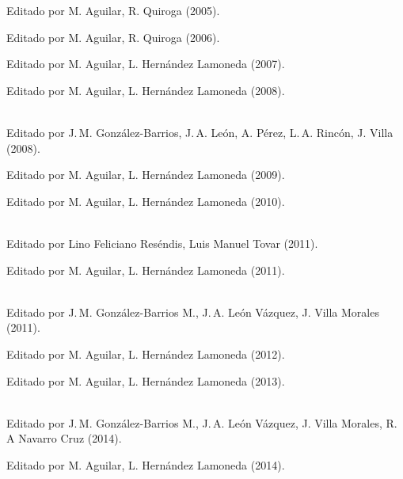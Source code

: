 Editado por M. Aguilar, R. Quiroga (2005). %

Editado por M. Aguilar, R. Quiroga (2006). %

Editado por M. Aguilar, L. Hernández Lamoneda (2007). %

Editado por M. Aguilar, L. Hernández Lamoneda (2008). %

 \\
Editado por J.\,M. González-Barrios, J.\,A. León, A. Pérez, L.\,A. Rincón, J. Villa (2008). %

Editado por M. Aguilar, L. Hernández Lamoneda (2009). %

Editado por M. Aguilar, L. Hernández Lamoneda (2010). %

 \\
Editado por Lino Feliciano Reséndis, Luis Manuel Tovar (2011). %

Editado por M. Aguilar, L. Hernández Lamoneda (2011). %

 \\
Editado por J.\,M. González-Barrios M., J.\,A. León Vázquez, J. Villa Morales (2011). %

Editado por M. Aguilar, L. Hernández Lamoneda (2012). %

Editado por M. Aguilar, L. Hernández Lamoneda (2013). %

 \\
Editado por J.\,M. González-Barrios M., J.\,A. León Vázquez,
J. Villa Morales, R.\,A Navarro Cruz (2014). %

Editado por M. Aguilar, L. Hernández Lamoneda (2014). %

